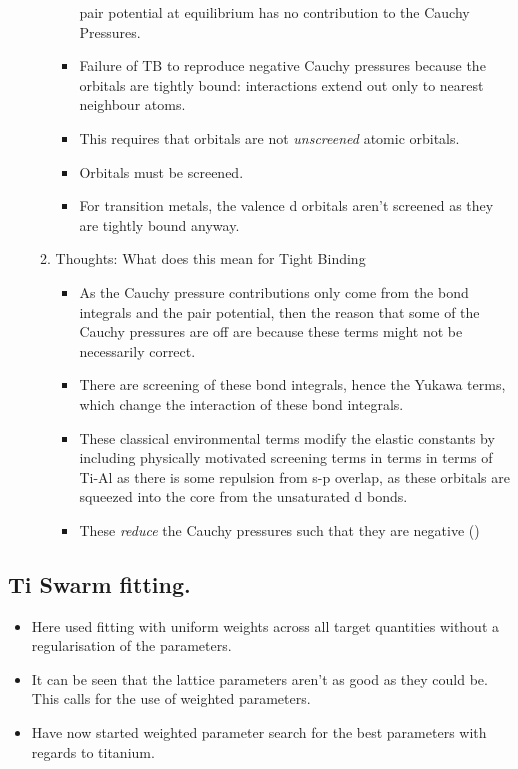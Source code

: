 \documentclass[11pt]{article}
\begin{document}
\begin{enumerate}
\begin{enumerate}
\begin{itemize}
pair potential at equilibrium has no contribution to the Cauchy
Pressures.
\item Failure of TB to reproduce negative Cauchy pressures because the
orbitals are tightly bound: interactions extend out only to nearest
neighbour atoms.
\item This requires that orbitals are not \emph{unscreened} atomic
orbitals.
\item Orbitals must be screened.
\item For transition metals, the valence d orbitals aren't screened as they are
tightly bound anyway.
\end{itemize}
\item Thoughts: What does this mean for Tight Binding
\label{sec-2-6-3-1-3}
\begin{itemize}
\item As the Cauchy pressure contributions only come from the bond integrals
and the pair potential, then the reason that some of the Cauchy
pressures are off are because these terms might not be necessarily
correct.
\item There are screening of these bond integrals, hence the Yukawa terms,
which change the interaction of these bond integrals.
\item These classical environmental terms modify the elastic constants by
including physically motivated screening terms in terms in terms of
Ti-Al as there is some repulsion from s-p overlap, as these orbitals
are squeezed into the core from the unsaturated d bonds.
\item These \emph{reduce} the Cauchy pressures such that they are negative
()
\end{itemize}
\end{enumerate}
\end{enumerate}
\subsection{Ti Swarm fitting.}
\label{sec-2-7}
\begin{itemize}
\item Here used fitting with uniform weights across all target quantities
without a regularisation of the parameters.
\item It can be seen that the lattice parameters aren't as good as they could
be. This calls for the use of weighted parameters.
\item Have now started weighted parameter search for the best parameters with
regards to titanium.
\end{itemize}
\end{document}
